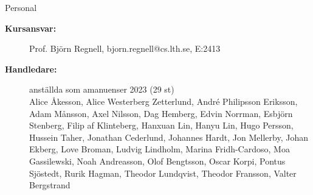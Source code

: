 \ifkompendium\else
\begin{SlideExtra}{Personal \CurrentYear}\SlideFontSmall
\begin{description}
\item [\bfseries Kursansvar:] Prof. Björn Regnell, bjorn.regnell@cs.lth.se, E:2413
\item [\bfseries Handledare:] anställda som amanuenser %
2023 
  (29 st) \\ 
  Alice Åkesson, Alice Westerberg Zetterlund, André Philipsson Eriksson, Adam Månsson, Axel Nilsson, Dag Hemberg, Edvin Norrman, Esbjörn Stenberg, Filip af Klinteberg, Hanxuan Lin, Hanyu Lin, Hugo Persson, Hussein Taher, Jonathan Cederlund, Johannes Hardt, Jon Mellerby, Johan Ekberg, Love Broman, Ludvig Lindholm, Marina Fridh-Cardoso, Moa Gassilewski, Noah Andreasson, Olof Bengtsson, Oscar Korpi, Pontus Sjöstedt, Rurik Hagman, Theodor Lundqvist, Theodor Fransson, Valter Bergstrand

\end{description}
\end{SlideExtra}
